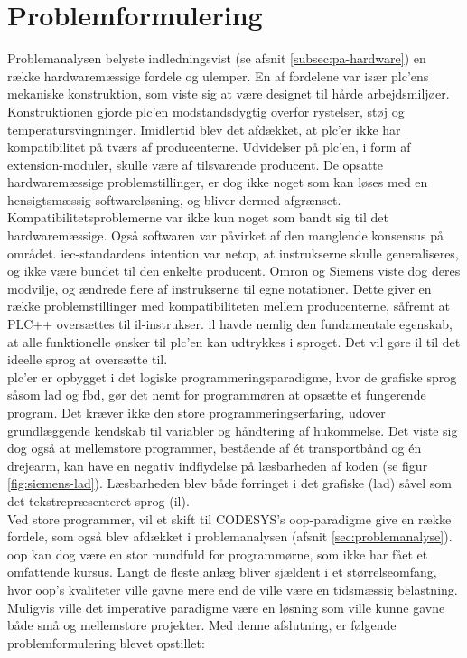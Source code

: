 \section{Problemformulering}
\label{sec:problemformulering}
Problemanalysen belyste indledningsvist (se afsnit \ref{subsec:pa-hardware}) en række hardwaremæssige fordele og ulemper. En af fordelene var især \gls{plc}'ens mekaniske konstruktion, som viste sig at være designet til hårde arbejdsmiljøer. Konstruktionen gjorde \gls{plc}’en modstandsdygtig overfor rystelser, støj og temperatursvingninger. Imidlertid blev det afdækket, at \gls{plc}’er ikke har kompatibilitet på tværs af producenterne. Udvidelser på \gls{plc}’en, i form af extension-moduler, skulle være af tilsvarende producent. De opsatte hardwaremæssige problemstillinger, er dog ikke noget som kan løses med en hensigtsmæssig softwareløsning, og bliver dermed afgrænset. \\ 

\noindent Kompatibilitetsproblemerne var ikke kun noget som bandt sig til det hardwaremæssige. Også softwaren var påvirket af den manglende konsensus på området. \gls{iec}-standardens intention var netop, at instrukserne skulle generaliseres, og ikke være bundet til den enkelte producent. Omron og Siemens viste dog deres modvilje, og ændrede flere af instrukserne til egne notationer. Dette giver en række problemstillinger med kompatibiliteten mellem producenterne, såfremt at PLC++ oversættes til \gls{il}-instrukser. \gls{il} havde nemlig den fundamentale egenskab, at alle funktionelle ønsker til \gls{plc}’en kan udtrykkes i sproget. Det vil gøre \gls{il} til det ideelle sprog at oversætte til. \\

\noindent \gls{plc}'er er opbygget i det logiske programmeringsparadigme, hvor de grafiske sprog såsom \gls{lad} og \gls{fbd}, gør det nemt for programmøren at opsætte et fungerende program. Det kræver ikke den store programmeringserfaring, udover grundlæggende kendskab til variabler og håndtering af hukommelse. Det viste sig dog også at mellemstore programmer, bestående af ét transportbånd og én drejearm, kan have en negativ indflydelse på læsbarheden af koden (se figur \ref{fig:siemens-lad}). Læsbarheden blev både forringet i det grafiske (\gls{lad}) såvel som det tekstrepræsenteret sprog (\gls{il}). \\

\noindent Ved store programmer, vil et skift til CODESYS’s \gls{oop}-paradigme give en række fordele, som også blev afdækket i problemanalysen (afsnit \ref{sec:problemanalyse}). \gls{oop} kan dog være en stor mundfuld for programmørne, som ikke har fået et omfattende kursus. Langt de fleste anlæg bliver sjældent i et størrelseomfang, hvor \gls{oop}’s kvaliteter ville gavne mere end de ville være en tidsmæssig belastning. Muligvis ville det imperative paradigme være en løsning som ville kunne gavne både små og mellemstore projekter. Med denne afslutning, er følgende problemformulering blevet opstillet: \\

